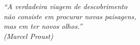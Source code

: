\vspace*{\fill}
	\begin{flushright}
		\textit{``A verdadeira viagem de descobrimento 
        \\não consiste em procurar novas paisagens,
        \\mas em ter novos olhos.''\\
		(Marcel Proust)}
	\end{flushright}
